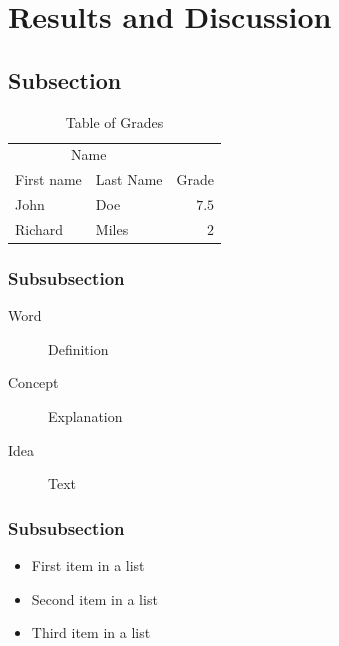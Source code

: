 \documentclass[fleqn,10pt]{SelfArx} %
\begin{document}

\section{Results and Discussion}

\lipsum[10] %

\subsection{Subsection}

\lipsum[11] %

\begin{table}[hbt]
\caption{Table of Grades}
\centering
\begin{tabular}{llr}
\toprule
\multicolumn{2}{c}{Name} \\
\cmidrule(r){1-2}
First name & Last Name & Grade \\
\midrule
John & Doe & $7.5$ \\
Richard & Miles & $2$ \\
\bottomrule
\end{tabular}
\label{tab:label}
\end{table}

\subsubsection{Subsubsection}

\lipsum[12] %

\begin{description}
\item[Word] Definition
\item[Concept] Explanation
\item[Idea] Text
\end{description}

\subsubsection{Subsubsection}

\lipsum[13] %

\begin{itemize}[noitemsep] %
\item First item in a list
\item Second item in a list
\item Third item in a list
\end{itemize}
\end{document}

